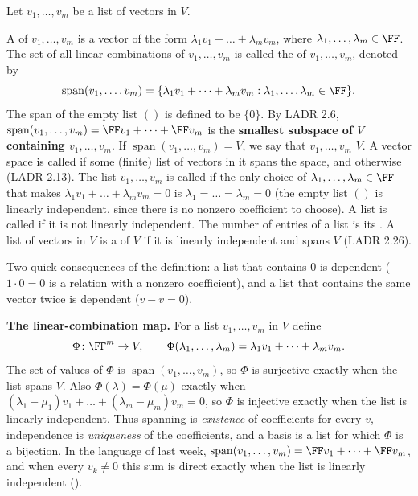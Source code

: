 \documentclass[10pt]{scrartcl}
\DeclareMathOperator{\spn}{span}
\begin{document}
\begin{definition*}
  Let $v_1,\dots,v_m$ be a list of vectors in $V$.
  \begin{itemize}
    \ii A  of $v_1,\dots,v_m$ is a vector of the form $\lambda_1v_1+\dots+\lambda_mv_m$, where $\lambda_1,\dots,\lambda_m\in\FF$.
    \ii The set of all linear combinations of $v_1,\dots,v_m$ is called the  of $v_1,\dots,v_m$, denoted by
    \[
      \spn(v_1,\dots,v_m) = \{\lambda_1v_1+\dots+\lambda_mv_m : \lambda_1,\dots,\lambda_m\in\FF\}.
    \]
    The span of the empty list $()$ is defined to be $\{0\}$. By LADR 2.6, $\spn(v_1,\dots,v_m)=\FF v_1+\dots+\FF v_m$ is the \textbf{smallest subspace of $V$ containing $v_1,\dots,v_m$}.
    \ii If $\spn(v_1,\dots,v_m)=V$, we say that $v_1,\dots,v_m$  $V$. A vector space is called  if some (finite) list of vectors in it spans the space, and  otherwise (LADR 2.13).
    \ii The list $v_1,\dots,v_m$ is called  if the only choice of $\lambda_1,\dots,\lambda_m\in\FF$ that makes $\lambda_1v_1+\dots+\lambda_mv_m=0$ is $\lambda_1=\dots=\lambda_m=0$ (the empty list $()$ is linearly independent, since there is no nonzero coefficient to choose). A list is called  if it is not linearly independent. The number of entries of a list is its .
    \ii A list of vectors in $V$ is a  of $V$ if it is linearly independent and spans $V$ (LADR 2.26).
  \end{itemize}
\end{definition*}

Two quick consequences of the definition: a list that contains $0$ is dependent ($1\cdot 0=0$ is a relation with a nonzero coefficient), and a list that contains the same vector twice is dependent ($v-v=0$).

\textbf{The linear-combination map.} For a list $v_1,\dots,v_m$ in $V$ define
\[
  \Phi\colon\FF^m\to V,\qquad \Phi(\lambda_1,\dots,\lambda_m)=\lambda_1v_1+\dots+\lambda_mv_m .
\]
The set of values of $\Phi$ is $\spn(v_1,\dots,v_m)$, so $\Phi$ is surjective exactly when the list spans $V$. Also $\Phi(\lambda)=\Phi(\mu)$ exactly when $(\lambda_1-\mu_1)v_1+\dots+(\lambda_m-\mu_m)v_m=0$, so $\Phi$ is injective exactly when the list is linearly independent. Thus spanning is \emph{existence} of coefficients for every $v$, independence is \emph{uniqueness} of the coefficients, and a basis is a list for which $\Phi$ is a bijection. In the language of last week, $\spn(v_1,\dots,v_m)=\FF v_1+\dots+\FF v_m$, and when every $v_k\ne0$ this sum is direct exactly when the list is linearly independent ().
\end{document}
